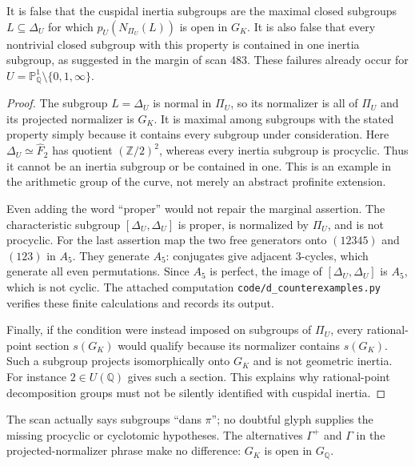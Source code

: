 It is false that the cuspidal inertia subgroups are the maximal closed subgroups
$L\subseteq\Delta_U$ for which $p_U(N_{\Pi_U}(L))$ is open in $G_K$.
It is also false that every nontrivial closed subgroup with this property is
contained in one inertia subgroup, as suggested in the margin of scan 483.
These failures already occur for $U=\mathbb P^1_{\mathbb Q}\setminus\{0,1,\infty\}$.
\begin{proof}
The subgroup $L=\Delta_U$ is normal in $\Pi_U$, so its normalizer is all of
$\Pi_U$ and its projected normalizer is $G_K$.  It is maximal among subgroups
with the stated property simply because it contains every subgroup under
consideration.  Here $\Delta_U\simeq\widehat F_2$ has quotient
$(\mathbb Z/2)^2$, whereas every inertia subgroup is procyclic.  Thus it cannot
be an inertia subgroup or be contained in one.  This is an example in the
arithmetic group of the curve, not merely an abstract profinite extension.

Even adding the word ``proper'' would not repair the marginal assertion.
The characteristic subgroup $[\Delta_U,\Delta_U]$ is proper, is normalized by
$\Pi_U$, and is not procyclic.  For the last assertion map the two free generators
onto $(12345)$ and $(123)$ in $A_5$.  They generate $A_5$: conjugates give
adjacent $3$-cycles, which generate all even permutations.  Since $A_5$ is
perfect, the image of $[\Delta_U,\Delta_U]$ is $A_5$, which is not cyclic.
The attached computation \texttt{code/d\_counterexamples.py} verifies these
finite calculations and records its output.

Finally, if the condition were instead imposed on subgroups of $\Pi_U$, every
rational-point section $s(G_K)$ would qualify because its normalizer contains
$s(G_K)$.  Such a subgroup projects isomorphically onto $G_K$ and is not
geometric inertia.  For instance $2\in U(\mathbb Q)$ gives such a section.
This explains why rational-point decomposition groups must not be silently
identified with cuspidal inertia.
\end{proof}
The scan actually says subgroups ``dans $\pi$''; no doubtful glyph supplies the
missing procyclic or cyclotomic hypotheses.  The alternatives
$\Gamma^+$ and $\Gamma$ in the projected-normalizer phrase make no difference:
$G_K$ is open in $G_{\mathbb Q}$.

